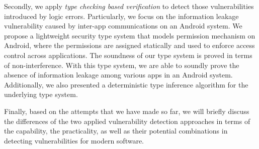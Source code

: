 Secondly, we apply \emph{type checking based verification} to detect those vulnerabilities introduced by logic errors. Particularly, we focus on the information leakage vulnerability caused by inter-app communications on an Android system. 
We propose a lightweight security type system that models permission mechanism on Android, where the permissions are assigned statically and used to enforce access control across applications. 
The soundness of our type system is proved in terms of non-interference. With this type system, we are able to soundly prove the absence of information leakage among various apps in an Android system.
 Additionally, we also presented a deterministic type inference algorithm for the underlying type system. 

Finally, based on the attempts that we have made so far, we will briefly discuss the differences of the two applied vulnerability detection approaches in terms of the capability, the practicality, as well as their potential combinations in detecting vulnerabilities for modern software.


